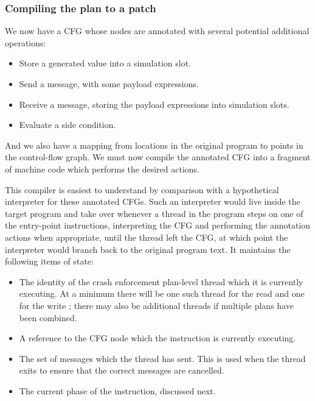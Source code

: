 \documentclass[12pt,a4paper]{book}
\begin{document}
\subsubsection{Compiling the plan to a patch}


We now have a CFG whose nodes are annotated with several potential additional operations:

\begin{itemize}
\item Store a generated value into a simulation slot.
\item Send a message, with some payload expressions.
\item Receive a message, storing the payload expressions into simulation slots.
\item Evaluate a side condition.
\end{itemize}

And we also have a mapping from locations in the original program to points in the control-flow graph.
We must now compile the annotated CFG into a fragment of machine code which performs the desired actions.

This compiler is easiest to understand by comparison with a hypothetical interpreter for these annotated CFGs.
Such an interpreter would live inside the target program and take over whenever a thread in the program steps on one of the entry-point instructions, interpreting the CFG and performing the annotation actions when appropriate, until the thread left the CFG, at which point the interpreter would branch back to the original program text.
It maintains the following items of state:

\begin{itemize}
\item
  The identity of the crash enforcement plan-level thread which it is currently executing.
  At a minimum there will be one such thread for the read \StateMachine and one for the write \StateMachine; there may also be additional threads if multiple plans have been combined.
\item
  A reference to the CFG node which the instruction is currently executing.
\item
  The set of messages which the thread has sent.
  This is used when the thread exits to ensure that the correct messages are cancelled.
\item
  The current phase of the instruction, discussed next.
\end{itemize}
\end{document}
